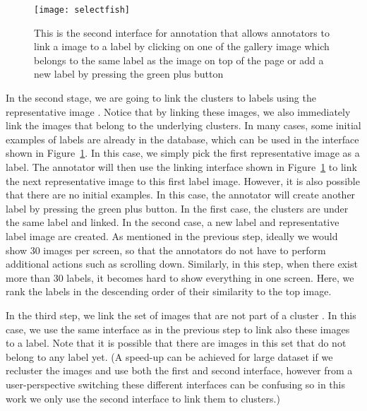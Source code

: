 \begin{figure}
\begin{center}
\texttt{[image: selectfish]}
\caption{This is the second interface for annotation that allows annotators to link a image to a label by clicking
on one of the gallery image which belongs to the same label as the image on top of the page or add a new label
by pressing the green plus button}
\label{fig:interface2}
\end{center}
\end{figure}
  
In the second stage, we are going to link the clusters to labels using the representative image . 
Notice that by linking these images, we also immediately link the images that belong to the underlying clusters. 
In many cases, some initial examples of labels are already in the database, which can be used in the interface shown in 
Figure~\ref{fig:interface2}. 
%
In this case, we simply pick the first representative image as a label. 
The annotator will then use the linking interface shown in Figure~\ref{fig:interface2} to link the next representative
image to this first label image.
However, it is also possible that there are no initial examples. In this case,
the annotator will create another label by pressing the green plus button. 
%
In the first case, the clusters are under the same label and linked. 
%
In the second case, a new label and representative label image are created. 
As mentioned in the previous step, ideally we would show 30 images per screen, so that 
the annotators do not have to perform additional actions such as scrolling down.
Similarly, in this step, when there exist more than 30 labels, it becomes hard to show everything
in one screen. Here, we rank the labels in the descending order
of their similarity to the top image. 

In the third step, we link the set of images that are not part of a cluster . 
In this case, we use the same 
interface as in the previous step to link also these images to a label. 
Note that it is possible that there
are images in this set that do not belong to any label yet. 
(A speed-up can be achieved for large dataset if we recluster the images
and use both the first and second interface, however from a user-perspective switching these different 
interfaces can be confusing so in this work we only use the second interface to link them to clusters.)



